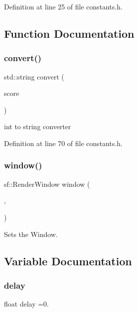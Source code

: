 Definition at line 25 of file constants.\+h.



\subsection{Function Documentation}
\mbox{\label{constants_8h_ad929726cad6c578c21e6cbe901b960f3}} 
\subsubsection{convert()}
{\footnotesize\ttfamily std\+::string convert (\begin{DoxyParamCaption}\item[{int}]{score }\end{DoxyParamCaption})}



int to string converter 



Definition at line 70 of file constants.\+h.

\mbox{\label{constants_8h_a9303a06fb4c20412a9ee96fdbaecfafc}} 
\subsubsection{window()}
{\footnotesize\ttfamily sf\+::\+Render\+Window window (\begin{DoxyParamCaption}\item[{sf\+::\+Video\+Mode(\textbf{ w}, \textbf{ h})}]{,  }\item[{\char`\"{}Snake \textbf{ Game}\char`\"{}}]{ }\end{DoxyParamCaption})}



Sets the Window. 



\subsection{Variable Documentation}
\mbox{\label{constants_8h_abdc33cf25e725134a9b48e79c7031bcf}} 
\subsubsection{delay}
{\footnotesize\ttfamily float delay =0.}



